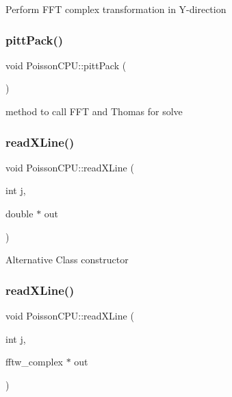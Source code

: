 Perform F\+FT complex transformation in Y-\/direction \mbox{\label{classPoissonCPU_af2ae0f3ef39f65a826872ab7ef777d74}} 
\subsubsection{\texorpdfstring{pitt\+Pack()}{pittPack()}}
{\footnotesize\ttfamily void Poisson\+C\+P\+U\+::pitt\+Pack (\begin{DoxyParamCaption}{ }\end{DoxyParamCaption})}

method to call F\+FT and Thomas for solve \mbox{\label{classPoissonCPU_a0530ee95c01660914bdd8a1feb04e2e2}} 
\subsubsection{\texorpdfstring{read\+X\+Line()}{readXLine()}\hspace{0.1cm}{\footnotesize\ttfamily [1/2]}}
{\footnotesize\ttfamily void Poisson\+C\+P\+U\+::read\+X\+Line (\begin{DoxyParamCaption}\item[{int}]{j,  }\item[{double $\ast$}]{out }\end{DoxyParamCaption})}

Alternative Class constructor \mbox{\label{classPoissonCPU_a90b4af0b201795377ccca1b4cfa3a914}} 
\subsubsection{\texorpdfstring{read\+X\+Line()}{readXLine()}\hspace{0.1cm}{\footnotesize\ttfamily [2/2]}}
{\footnotesize\ttfamily void Poisson\+C\+P\+U\+::read\+X\+Line (\begin{DoxyParamCaption}\item[{int}]{j,  }\item[{fftw\+\_\+complex $\ast$}]{out }\end{DoxyParamCaption})}

